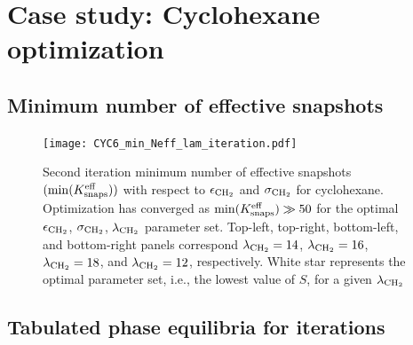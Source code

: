 \documentclass[journal=jctc,manuscript=article]{achemso}
\begin{document}
\newpage
\clearpage

\section{Case study: Cyclohexane optimization} \label{SI sec: Case study}

\subsection{Minimum number of effective snapshots} \label{SI sec: Min eff}

\begin{figure}[htb!]
	\centering
	\texttt{[image: CYC6\_min\_Neff\_lam\_iteration.pdf]}
	\caption{Second iteration minimum number of effective snapshots $(\min(K_{\rm snaps}^{\rm eff}))$ with respect to $\epsilon_{\rm CH_2}$ and $\sigma_{\rm CH_2}$ for cyclohexane. Optimization has converged as $\min(K_{\rm snaps}^{\rm eff}) \gg 50$ for the optimal $\epsilon_{\rm CH_2}$, $\sigma_{\rm CH_2}$, $\lambda_{\rm CH_2}$ parameter set. Top-left, top-right, bottom-left, and bottom-right panels correspond $\lambda_{\rm CH_2} = 14$, $\lambda_{\rm CH_2} = 16$, $\lambda_{\rm CH_2} = 18$, and $\lambda_{\rm CH_2} = 12$, respectively. White star represents the optimal parameter set, i.e., the lowest value of $S$, for a given $\lambda_{\rm CH_2}$}
	\label{SI fig:Iterate_Neff_CYC6}
\end{figure}

\newpage
\clearpage

\subsection{Tabulated phase equilibria for iterations}
\end{document}

